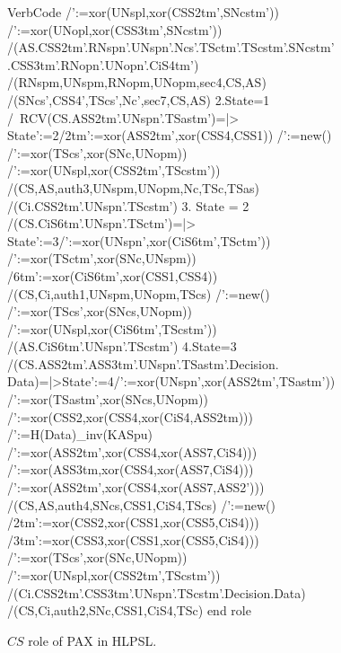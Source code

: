 \documentclass[journal,article,submit,moreauthors,pdftex]{Definitions/mdpi}
\begin{document}
\begin{figure}[H]
\begin {minipage}[t]{0.48\textwidth}
\begin{SaveVerbatim}{VerbCode}
  /\UNspn':=xor(UNspl,xor(CSS2tm',SNcstm'))
  /\UNopn':=xor(UNopl,xor(CSS3tm',SNcstm'))
  /\SND(AS.CSS2tm'.RNspn'.UNspn'.Ncs'.TSctm'.TScstm'.SNcstm'
  .CSS3tm'.RNopn'.UNopn'.CiS4tm')
  /\secret({RNspm,UNspm,RNopm,UNopm},sec4,{CS,AS})
  /\secret({SNcs',CSS4',TScs',Nc'},sec7,{CS,AS})
2.State=1 /\ RCV(CS.ASS2tm'.UNspn'.TSastm')=|>
  State':=2/\CSS2tm':=xor(ASS2tm',xor(CSS4,CSS1))
  /\TScs':=new()
  /\TScstm':=xor(TScs',xor(SNc,UNopm))
  /\UNspn':=xor(UNspl,xor(CSS2tm',TScstm'))
  /\witness(CS,AS,auth3,{UNspm,UNopm,Nc,TSc,TSas})
  /\SND(Ci.CSS2tm'.UNspn'.TScstm')
3. State = 2 /\RCV(CS.CiS6tm'.UNspn'.TSctm')=|>
   State':=3/\UNspl':=xor(UNspn',xor(CiS6tm',TSctm'))
  /\TSc':=xor(TSctm',xor(SNc,UNspm))
  /\CiS6tm':=xor(CiS6tm',xor(CSS1,CSS4))
  /\request(CS,Ci,auth1,{UNspm,UNopm,TScs})
  /\TScs':=new()
  /\TScstm':=xor(TScs',xor(SNcs,UNopm))
  /\UNspn':=xor(UNspl,xor(CiS6tm',TScstm'))
  /\SND(AS.CiS6tm'.UNspn'.TScstm')
4.State=3 /\RCV(CS.ASS2tm'.ASS3tm'.UNspn'.TSastm'.Decision.
   Data)=|>State':=4/\UNspl':=xor(UNspn',xor(ASS2tm',TSastm'))
  /\TSas':=xor(TSastm',xor(SNcs,UNopm))
  /':=xor(CSS2,xor(CSS4,xor(CiS4,ASS2tm)))
  /':={H(Data)}_inv(KASpu)
  /':=xor(ASS2tm',xor(CSS4,xor(ASS7,CiS4)))
  /':=xor(ASS3tm,xor(CSS4,xor(ASS7,CiS4)))
  /':=xor(ASS2tm',xor(CSS4,xor(ASS7,ASS2')))
  /\request(CS,AS,auth4,{SNcs,CSS1,CiS4,TScs})
  /\TScs':=new()
  /\CSS2tm':=xor(CSS2,xor(CSS1,xor(CSS5,CiS4)))
  /\CSS3tm':=xor(CSS3,xor(CSS1,xor(CSS5,CiS4)))
  /\TScstm':=xor(TScs',xor(SNc,UNopm))
  /\UNspn':=xor(UNspl,xor(CSS2tm',TScstm'))
  /\SND(Ci.CSS2tm'.CSS3tm'.UNspn'.TScstm'.Decision.Data)
  /\witness(CS,Ci,auth2,{SNc,CSS1,CiS4,TSc})
end role
\end{SaveVerbatim}
\setlength{\fboxsep}{1mm}

\caption{$CS$ role of PAX in HLPSL.}
 \label{fig:avispa_cs}
 \end{minipage}
\end{figure}
\end{document}
